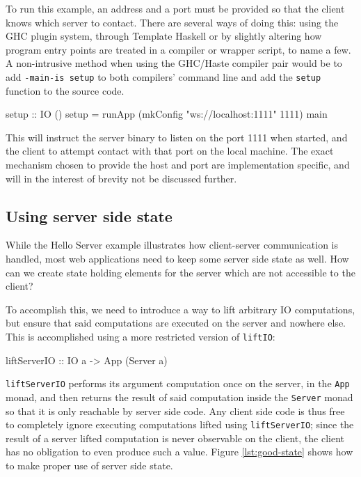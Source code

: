 \documentclass[preprint]{sigplanconf}
\begin{document}
To run this example, an address and a port must be provided so that the client
knows which server to contact. There are several ways of doing this:
using the GHC plugin system, through Template Haskell or by slightly altering
how program entry points are treated in a compiler or wrapper script, to name
a few. A non-intrusive method when using the GHC/Haste compiler pair would
be to add \lstinline!-main-is setup! to both compilers' command line
and add the \lstinline!setup! function to the source code.

\begin{code}
setup :: IO ()
setup =
  runApp (mkConfig "ws://localhost:1111" 1111) main
\end{code}

This will instruct the server binary to listen on the port 1111 when
started, and the client to attempt contact with that port on the local machine.
The exact mechanism chosen to provide the host and port are implementation
specific, and will in the interest of brevity not be discussed further.

\subsection{Using server side state}

While the Hello Server example illustrates how client-server communication is
handled, most web applications need to keep some server side state as well.
How can we create state holding elements for the server which are not
accessible to the client?

To accomplish this, we need to introduce a way to lift arbitrary IO
computations, but ensure that said computations are executed on the server and
nowhere else. This is accomplished using a more restricted version of
\lstinline!liftIO!:

\begin{code}
liftServerIO :: IO a -> App (Server a)
\end{code}

\lstinline!liftServerIO! performs its argument computation once on the server,
in the \lstinline!App! monad, and then returns the result of said computation
inside the \lstinline!Server! monad so that it is only reachable by server side
code.
Any client side code is thus free to completely ignore executing
computations lifted using \lstinline!liftServerIO!; since the result of a
server lifted computation is never observable on the client, the client has no
obligation to even produce such a value. Figure \ref{lst:good-state} shows how
to make proper use of server side state.
\end{document}
